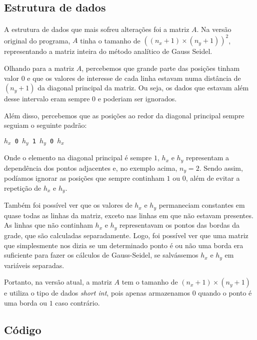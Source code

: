 \documentclass[12pt]{article}
\begin{document}
	\subsection{Estrutura de dados}
	\paragraph{}
	A estrutura de dados que mais sofreu alterações foi a matriz $A$.
	Na versão original do programa, $A$ tinha o tamanho de $((n_x+1)\times(n_y+1))^2$, representando a matriz inteira do método analítico de Gauss Seidel.
	
	Olhando para a matriz $A$, percebemos que grande parte das posições tinham valor $0$ e que os valores de interesse de cada linha estavam numa distância de $(n_y+1)$ da diagonal principal da matriz.
	Ou seja, os dados que estavam além desse intervalo eram sempre $0$ e poderiam ser ignorados.
	
	Além disso, percebemos que as posições ao redor da diagonal principal sempre seguiam o seguinte padrão:
	
	\begin{center}
		\texttt{$h_x$ 0 $h_y$ 1 $h_y$ 0 $h_x$}
	\end{center}
	
	Onde o elemento na diagonal principal é sempre $1$, $h_x$ e $h_y$ representam a dependência dos pontos adjacentes e, no exemplo acima, $n_y=2$.
	Sendo assim, podíamos ignorar as posições que sempre continham $1$ ou $0$, além de evitar a repetição de $h_x$ e $h_y$.
	
	Também foi possível ver que os valores de $h_x$ e $h_y$ permaneciam constantes em quase todas as linhas da matriz, exceto nas linhas em que não estavam presentes.
	As linhas que não continham $h_x$ e $h_y$ representavam os pontos das bordas da grade, que são calculadas separadamente.
	Logo, foi possível ver que uma matriz que simplesmente nos dizia se um determinado ponto é ou não uma borda era suficiente para fazer os cálculos de Gauss-Seidel, se salvássemos $h_x$ e $h_y$ em variáveis separadas.
	
	Portanto, na versão atual, a matriz $A$ tem o tamanho de $(n_x+1)\times(n_y+1)$ e utiliza o tipo de dados \emph{short int}, pois apenas armazenamos $0$ quando o ponto é uma borda ou $1$ caso contrário.

	\subsection{Código}
	
\end{document}
